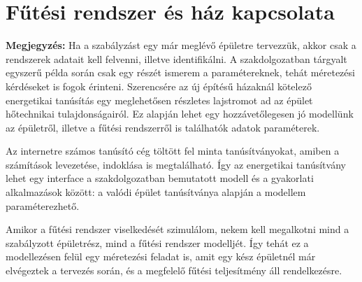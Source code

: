
\section{Fűtési rendszer és ház kapcsolata}

\begin{formal}
	\textbf{Megjegyzés:}
	Ha a szabályzást egy már meglévő épületre tervezzük, akkor csak a rendszerek adatait kell felvenni, illetve identifikálni. A szakdolgozatban tárgyalt egyszerű példa során csak egy részét ismerem a paramétereknek, tehát méretezési kérdéseket is fogok érinteni.  Szerencsére az új építésű házaknál kötelező energetikai tanúsítás%
 egy meglehetősen részletes lajstromot ad az épület hőtechnikai tulajdonságairól. Ez alapján lehet egy hozzávetőlegesen jó modellünk az épületről, illetve a fűtési rendszerről is találhatók adatok paraméterek.

\end{formal}



 Az internetre számos tanúsító cég töltött fel minta tanúsítványokat, amiben a számítások levezetése, indoklása is megtalálható. Így az energetikai tanúsítvány lehet egy interface a szakdolgozatban bemutatott modell és a gyakorlati alkalmazások között: a valódi épület tanúsítványa alapján a modellem paraméterezhető.


Amikor a fűtési rendszer viselkedését szimulálom, nekem kell megalkotni mind a szabályzott épületrész, mind a fűtési rendszer modelljét. Így tehát ez a modellezésen felül egy méretezési feladat is, amit egy kész épületnél már elvégeztek a tervezés során, és a megfelelő fűtési teljesítmény áll rendelkezésre. %






%
%
%




\pagebreak
